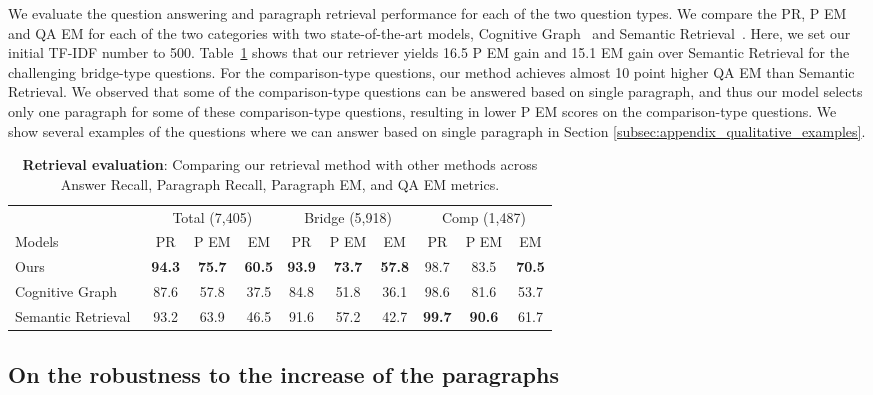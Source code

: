 \documentclass{article} \usepackage{iclr2020_conference,times}
\begin{document}
We evaluate the question answering and paragraph retrieval performance for each of the two question types. 
We compare the PR, P EM and QA EM for each of the two categories with two state-of-the-art models, Cognitive Graph~\citep{cognitive_graph_2019} and Semantic Retrieval~\citep{nie_pip_2019}. 
Here, we set our initial TF-IDF number  to 500. 
Table~\ref{table:retrieval_results_per_category} shows that our retriever yields 16.5 P EM gain and 15.1 EM gain over Semantic Retrieval for the challenging bridge-type questions. 
For the comparison-type questions, our method achieves almost 10 point higher QA EM than Semantic Retrieval. 
We observed that some of the comparison-type questions can be answered based on single paragraph, and thus our model selects only one paragraph for some of these comparison-type questions, resulting in lower P EM scores on the comparison-type questions. 
We show several examples of the questions where we can answer based on single paragraph in Section \ref{subsec:appendix_qualitative_examples}.


\begin{table}[!tb]
\centering
    \small{
\begin{tabular}{ l | c c c | c c c | cc c}\toprule 
& \multicolumn{3}{c}{Total (7,405)} & \multicolumn{3}{|c|}{Bridge (5,918)} &  \multicolumn{3}{c}{Comp (1,487)}  \\
 Models  & PR & P EM & EM & PR & P EM & EM & PR & P EM & EM  \\
  \midrule
  Ours  & \bf 94.3& \bf 75.7 & \bf 60.5& \bf 93.9 & \bf 73.7 & \bf 57.8& 98.7 & 83.5 & \bf 70.5\\\hdashline
Cognitive Graph~\citep{cognitive_graph_2019} & 87.6& 57.8 & 37.5 & 84.8 & 51.8 & 36.1&  98.6 & 81.6 & 53.7\\
  Semantic Retrieval~\citep{nie_pip_2019} & 93.2 & 63.9 & 46.5 & 91.6 & 57.2 & 42.7& \bf 99.7 & \bf 90.6 & 61.7\\
  \bottomrule
\end{tabular}
    \caption{{\bf Retrieval evaluation}: Comparing our retrieval method with other methods across Answer Recall, Paragraph Recall, Paragraph EM, and QA EM metrics.
}\label{table:retrieval_results_per_category}
    }
\end{table}


\subsection{On the robustness to the increase of the paragraphs} 
\label{subsec:appendix_robust}
\end{document}
